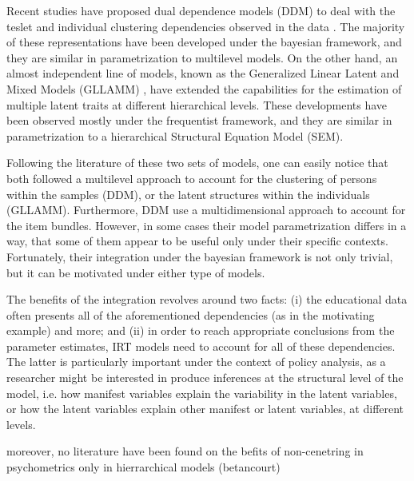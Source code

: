 Recent studies have proposed dual dependence models (DDM) to deal with the teslet and individual clustering dependencies observed in the data \cite{Fujimoto_2020, Fujimoto_2018a, Fujimoto_2018b, Jiao_et_al_2012, Flores_2012, Fox_2010, Reckase_2009, Bradlow_1999}. The majority of these representations have been developed under the bayesian framework, and they are similar in parametrization to multilevel models. On the other hand, an almost independent line of models, known as the Generalized Linear Latent and Mixed Models (GLLAMM) \cite{Rabe_et_al_2004a, Rabe_et_al_2004b, Skrondal_et_al_2004a, Rabe_et_al_2012}, have extended the capabilities for the estimation of multiple latent traits at different hierarchical levels. These developments have been observed mostly under the frequentist framework, and they are similar in parametrization to a hierarchical Structural Equation Model (SEM).

Following the literature of these two sets of models, one can easily notice that both followed a multilevel approach to account for the clustering of persons within the samples (DDM), or the latent structures within the individuals (GLLAMM). Furthermore, DDM use a multidimensional approach to account for the item bundles. However, in some cases their model parametrization differs in a way, that some of them appear to be useful only under their specific contexts. Fortunately, their integration under the bayesian framework is not only trivial, but it can be motivated under either type of models.

The benefits of the integration revolves around two facts: (i) the educational data often presents all of the aforementioned dependencies (as in the motivating example) and more; and (ii) in order to reach appropriate conclusions from the parameter estimates, IRT models need to account for all of these dependencies. The latter is particularly important under the context of policy analysis, as a researcher might be interested in produce inferences at the structural level of the model, i.e. how manifest variables explain the variability in the latent variables, or how the latent variables explain other manifest or latent variables, at different levels.



moreover, no literature have been found on the befits of non-cenetring in psychometrics only in hierrarchical models (betancourt)



